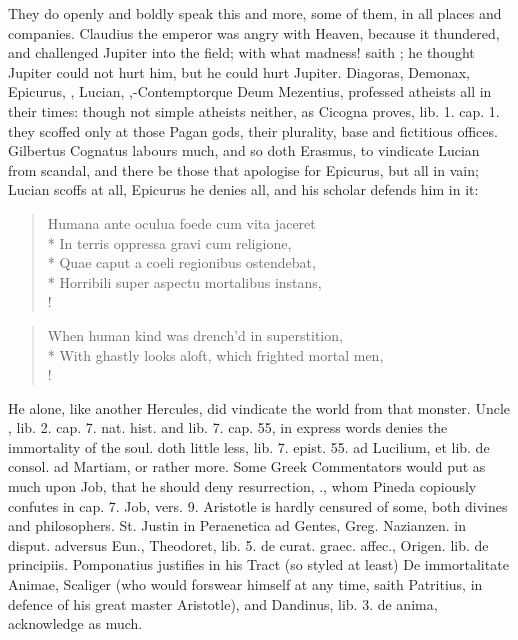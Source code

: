 {They do openly and boldly speak this and more, some of them, in all
places and companies. Claudius the emperor was angry with Heaven,
because it thundered, and challenged Jupiter into the field; with what
madness! saith \Seneca; he thought Jupiter could not hurt him, but he
could hurt Jupiter. Diagoras, Demonax, Epicurus, \Pliny{}, Lucian,
\Lucretius{},-Contemptorque Deum Mezentius, professed atheists all in
their times: though not simple atheists neither, as Cicogna proves,
lib. 1. cap. 1. they scoffed only at those Pagan gods, their plurality,
base and fictitious offices. Gilbertus Cognatus labours much, and so
doth Erasmus, to vindicate Lucian from scandal, and there be those that
apologise for Epicurus, but all in vain; Lucian scoffs at all, Epicurus
he denies all, and \Lucretius{} his scholar defends him in it:
%
\begin{latin}%
\begin{verse}%
Humana ante oculua foede cum vita jaceret\\*
In terris oppressa gravi cum religione,\\*
Quae caput a coeli regionibus ostendebat,\\*
Horribili super aspectu mortalibus instans, \etc{}\\!
\end{verse}%
\end{latin}%
\translationrule%
\begin{verse}%
When human kind was drench'd in superstition,\\*
With ghastly looks aloft, which frighted mortal men, \etc{}\\!
\end{verse}%
%

He alone, like another Hercules, did vindicate the world from that
monster. Uncle \Pliny{}, lib. 2. cap. 7. nat. hist. and lib. 7. cap.
55, in express words denies the immortality of the soul. \Seneca
doth little less, lib. 7. epist. 55. ad Lucilium, et lib. de consol. ad
Martiam, or rather more. Some Greek Commentators would put as much upon
Job, that he should deny resurrection, \etc{}., whom Pineda copiously
confutes in cap. 7. Job, vers. 9. Aristotle is hardly censured of some,
both divines and philosophers. St. Justin in Peraenetica ad Gentes,
Greg. Nazianzen. in disput. adversus Eun., Theodoret, lib. 5. de curat.
graec. affec., Origen. lib. de principiis. Pomponatius justifies in his
Tract (so styled at least) De immortalitate Animae, Scaliger (who would
forswear himself at any time, saith Patritius, in defence of his great
master Aristotle), and Dandinus, lib. 3. de anima, acknowledge as much.

}
